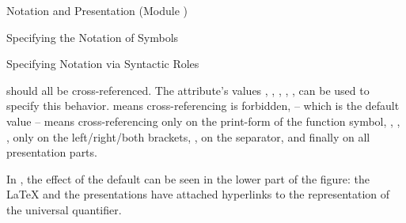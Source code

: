 \begin{tchapter}[id=pres,short=Notation and Presentation]{Notation and Presentation (Module {})}
\begin{tsection}[id=presentation,short=Notation of Symbols]{Specifying the Notation of Symbols}
\begin{tsubsection}[id=pres-declarative]{Specifying Notation via Syntactic Roles}
\begin{description}
  should all be cross-referenced. The attribute's values
  {},
  {},
  {},
  {},
  {},
  {}
  {} can be used to specify this behavior.
  {} means cross-referencing is forbidden,
  {} -- which is the default value -- means
  cross-referencing only on the print-form of the function symbol,
  {},
  {},
  {}, only on the left/right/both
  brackets, {}, on the separator, and
  finally {} on all presentation parts.
  
  In {}, the effect of the default
  {} can be seen in the lower part of
  the figure: the {\LaTeX} and the {\html} presentations have attached hyperlinks
  to the representation of the universal quantifier.
\end{description}


\end{tsubsection}
\end{tsection}
\end{tchapter}
